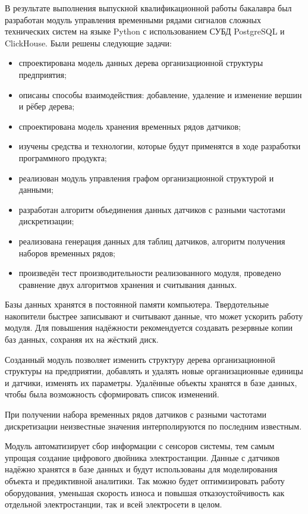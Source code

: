\conclusion

В результате выполнения выпускной квалификационной работы бакалавра был разработан модуль управления временными рядами сигналов сложных технических систем на языке Python с использованием СУБД PostgreSQL и ClickHouse. Были решены следующие задачи:

\begin{itemize}
    \item спроектирована модель данных дерева организационной структуры предприятия;
    \item описаны способы взаимодействия: добавление, удаление и изменение вершин и рёбер дерева;
    \item спроектирована модель хранения временных рядов датчиков;
    \item изучены средства и технологии, которые будут применятся в ходе разработки программного продукта;
    \item реализован модуль управления графом организационной структурой и данными;
    \item разработан алгоритм объединения данных датчиков с разными частотами дискретизации;
    \item реализована генерация данных для таблиц датчиков, алгоритм получения наборов временных рядов;
    \item произведён тест производительности реализованного модуля, проведено сравнение двух алгоритмов хранения и считывания данных.
\end{itemize}

Базы данных хранятся в постоянной памяти компьютера. Твердотельные накопители быстрее записывают и считывают данные, что может ускорить работу модуля. Для повышения надёжности рекомендуется создавать резервные копии баз данных, сохраняя их на жёсткий диск.

Созданный модуль позволяет изменить структуру дерева организационной структуры на предприятии, добавлять и удалять новые организационные единицы и датчики, изменять их параметры. Удалённые объекты хранятся в базе данных, чтобы была возможность сформировать список изменений.

При получении набора временных рядов датчиков с разными частотами дискретизации неизвестные значения интерполируются по последним известным.

Модуль автоматизирует сбор информации с сенсоров системы, тем самым упрощая создание цифрового двойника электростанции. Данные с датчиков надёжно хранятся в базе данных и будут использованы для моделирования объекта и предиктивной аналитики. Так можно будет оптимизировать работу оборудования, уменьшая скорость износа и повышая отказоустойчивость как отдельной электростанции, так и всей электросети в целом.
